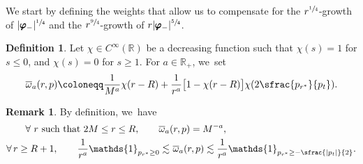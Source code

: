 \documentclass[10pt]{amsart}
\theoremstyle{plain}
\theoremstyle{definition}
\newtheorem{definition}[proposition]{Definition}
\newtheorem{remark}[proposition]{Remark}
\newcommand\R{{\mathbb{R}}}
\begin{document}
We start by defining the weights that allow us to compensate for the $r^{\sfrac{1}{4}}$-growth of $|\pmb{\varphi}_-|^{\sfrac{1}{4}}$ and the $r^{\sfrac{9}{4}}$-growth of $r|\pmb{\varphi}_-|^{\sfrac{5}{4}}$.

\begin{definition}\label{Defweight}
Let $\chi \in C^\infty (\R)$ be a decreasing function such that $\chi (s) =1$ for $s \leq 0$, and $\chi (s) =0$ for $s \geq 1$. For $a \in \R_+$, we~set
\[
\overline{\omega}_a(r,p) \coloneqq \frac{1}{M^a}\chi (r-R)+\frac{1}{r^a}\bigl[ 1-\chi(r-R) \bigr] \chi(2\sfrac{p_{r^*}}{p_t}).
\]
\end{definition}
\begin{remark}
By definition, we~have
\begin{align*}
\forall \text{ $r$ such that } 2M \leq r \leq R, \qquad \overline{\omega}_a &(r,p) =M^{-a},\\
\forall \, r \geq R+1, \qquad \frac{1}{r^a} \mathds{1}_{p_{r^*} \geq 0} \lesssim &\,\,\overline{\omega}_a(r,p) \lesssim \frac{1}{r^a} \mathds{1}_{p_{r^*} \geq -\sfrac{|p_t|}{2}}.
\end{align*}
\end{remark}
\end{document}
